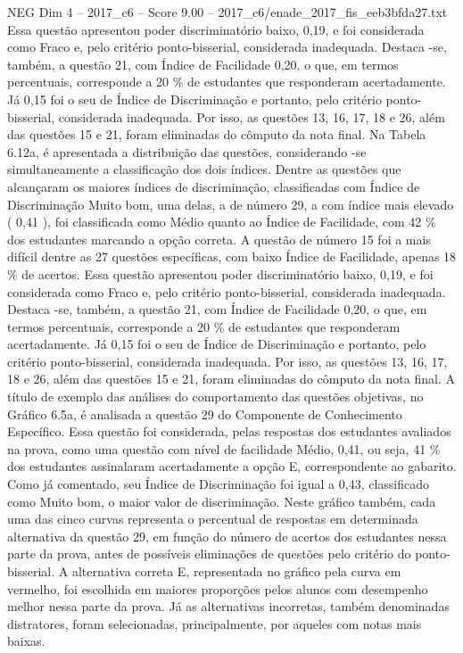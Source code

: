 \begin{textsample}{NEG Dim 4 – 2017\_c6 – Score 9.00 – 2017\_c6/enade\_2017\_fis\_eeb3bfda27.txt}
Essa questão apresentou poder discriminatório baixo, 0,19, e foi considerada como Fraco e, pelo critério ponto-bisserial, considerada inadequada.
Destaca -se, também, a questão 21, com Índice de Facilidade 0,20, o que, em termos percentuais, corresponde a 20 \% de estudantes que responderam acertadamente.
Já 0,15 foi o seu de Índice de Discriminação e portanto, pelo critério ponto-bisserial, considerada inadequada.
Por isso, as questões 13, 16, 17, 18 e 26, além das questões 15 e 21, foram eliminadas do cômputo da nota final.
Na Tabela 6.12a, é apresentada a distribuição das questões, considerando -se simultaneamente a classificação dos dois índices.
Dentre as questões que alcançaram os maiores índices de discriminação, classificadas com Índice de Discriminação Muito bom, uma delas, a de número 29, a com índice mais elevado ( 0,41 ), foi classificada como Médio quanto ao Índice de Facilidade, com 42 \% dos estudantes marcando a opção correta.
A questão de número 15 foi a mais difícil dentre as 27 questões específicas, com baixo Índice de Facilidade, apenas 18 \% de acertos.
Essa questão apresentou poder discriminatório baixo, 0,19, e foi considerada como Fraco e, pelo critério ponto-bisserial, considerada inadequada.
Destaca -se, também, a questão 21, com Índice de Facilidade 0,20, o que, em termos percentuais, corresponde a 20 \% de estudantes que responderam acertadamente.
Já 0,15 foi o seu de Índice de Discriminação e portanto, pelo critério ponto-bisserial, considerada inadequada.
Por isso, as questões 13, 16, 17, 18 e 26, além das questões 15 e 21, foram eliminadas do cômputo da nota final.
A título de exemplo das análises do comportamento das questões objetivas, no Gráfico 6.5a, é analisada a questão 29 do Componente de Conhecimento Específico.
Essa questão foi considerada, pelas respostas dos estudantes avaliados na prova, como uma questão com nível de facilidade Médio, 0,41, ou seja, 41 \% dos estudantes assinalaram acertadamente a opção E, correspondente ao gabarito.
Como já comentado, seu Índice de Discriminação foi igual a 0,43, classificado como Muito bom, o maior valor de discriminação.
Neste gráfico também, cada uma das cinco curvas representa o percentual de respostas em determinada alternativa da questão 29, em função do número de acertos dos estudantes nessa parte da prova, antes de possíveis eliminações de questões pelo critério do ponto-bisserial.
A alternativa correta E, representada no gráfico pela curva em vermelho, foi escolhida em maiores proporções pelos alunos com desempenho melhor nessa parte da prova.
Já as alternativas incorretas, também denominadas distratores, foram selecionadas, principalmente, por aqueles com notas mais baixas.

\end{textsample}
